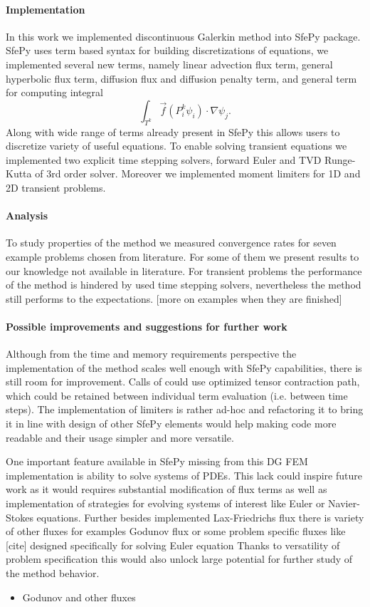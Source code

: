 \paragraph{Implementation}
In this work we implemented discontinuous Galerkin method into SfePy package. SfePy uses 
term based syntax for building discretizations of equations, we implemented several 
new terms, namely linear advection flux term, general hyperbolic flux term, diffusion 
flux and diffusion penalty term, and general term for computing integral
$$
\int_{T^k} \vec{f}(P_i^k\psi_i)\cdot\nabla\psi_j. 
$$
Along with wide range of terms already present in SfePy this allows users to discretize 
variety of useful equations. To enable solving transient equations we implemented two 
explicit time stepping solvers, forward Euler and TVD Runge-Kutta of 3rd order 
solver. Moreover we implemented moment limiters for 1D and 2D transient problems.

\paragraph{Analysis}
To study properties of the method we measured convergence rates for seven example 
problems chosen from literature. For some of them we present results to our knowledge not 
available in literature. For transient problems the performance of the method is hindered 
by used time stepping solvers, nevertheless the method still performs to the expectations.
[\todo more on examples when they are finished]

\paragraph{Possible improvements and suggestions for further work}
Although from the time and memory requirements perspective the implementation of the 
method scales well enough with SfePy capabilities, there is still room for improvement. 
Calls of  could use optimized tensor contraction path, which could 
be retained between individual term evaluation (i.e. between time steps). 
The implementation of limiters is rather ad-hoc and refactoring it to bring it in line 
with design of other SfePy elements would help making code more readable and their usage 
simpler and more versatile. 

One important feature available in SfePy missing from this DG FEM implementation is 
ability to solve systems of PDEs. This lack could inspire future work as it would 
requires substantial modification of flux terms as well as implementation of  
strategies for evolving systems of interest like Euler or Navier-Stokes equations. 
Further besides implemented Lax-Friedrichs flux there is variety of other fluxes for 
examples Godunov flux or some problem specific fluxes like [\todo cite] designed 
specifically for solving Euler equation Thanks to versatility of problem specification 
this would also unlock large potential for further study of the method behavior. 

\begin{itemize}
	\item Godunov and other fluxes
\end{itemize}
